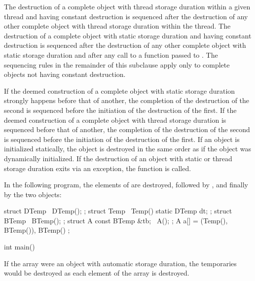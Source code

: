 \pnum
The destruction of a complete object with thread storage duration within a given thread
and having constant destruction
is sequenced after the destruction of any other complete object
with thread storage duration within the thread.
The destruction of a complete object with static storage duration
and having constant destruction
is sequenced after the destruction of any other complete object
with static storage duration
and after any call to a function passed to .
The sequencing rules in the remainder of this subclause
apply only to complete objects not having constant destruction.

\pnum
If the deemed construction of a complete object with static
storage duration strongly happens before that of another, the completion of the destruction
of the second is sequenced before the initiation of the destruction of the first.
If the deemed construction of a complete object with thread
storage duration is sequenced before that of another, the completion of the destruction
of the second is sequenced before the initiation of the destruction of the first.
If an object is
initialized statically, the object is destroyed in the same order as if
the object was dynamically initialized.
If the destruction of an object with static or thread storage duration
exits via an exception,
the function  is called.
\begin{example}
In the following program,
the elements of  are destroyed,
followed by , and
finally by the two  objects:
\begin{codeblock}
struct DTemp { ~DTemp(); };
struct Temp {
  ~Temp() {
    static DTemp dt;
  }
};
struct BTemp {
  ~BTemp();
};
struct A {
  const BTemp &tb;
  ~A();
};
A a[] = { (Temp(), BTemp()), BTemp() };

int main() {}
\end{codeblock}
If the array  were an object with automatic storage duration,
the  temporaries would be destroyed
as each element of the array is destroyed.
\end{example}

